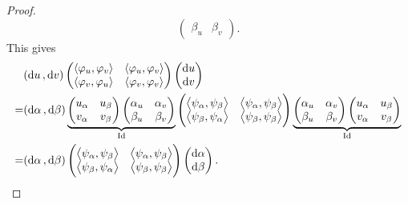 \begin{proof}
\[\begin{pmatrix}
            \beta_u & \beta_v
        \end{pmatrix}
    .\] This gives
    \begin{align*}
        &(\dd{u},\dd{v})
        \begin{pmatrix}
            \left<\varphi_u,\varphi_v\right> & \left<\varphi_u,\varphi_v\right> \\
            \left<\varphi_v,\varphi_u\right> & \left<\varphi_v,\varphi_v\right> 
        \end{pmatrix}\begin{pmatrix}
        \dd{u} \\ \dd{v}
        \end{pmatrix} \\
        =&(\dd{\alpha},\dd{\beta})\underbrace{\begin{pmatrix}
            u_\alpha & u_\beta \\
            v_\alpha & v_\beta
            \end{pmatrix}\begin{pmatrix}
            \alpha_u & \alpha_v \\
            \beta_u & \beta_v
        \end{pmatrix}}_{\mathrm{Id}}\begin{pmatrix}
        \left<\psi_\alpha,\psi_\beta\right> & \left<\psi_\alpha,\psi_\beta\right> \\
        \left<\psi_\beta,\psi_\alpha\right> & \left<\psi_\beta,\psi_\beta\right> 
        \end{pmatrix}\underbrace{\begin{pmatrix}
            \alpha_u & \alpha_v \\
            \beta_u & \beta_v
        \end{pmatrix}\begin{pmatrix}
            u_\alpha & u_\beta \\
            v_\alpha & v_\beta
        \end{pmatrix}}_{\mathrm{Id}} \\
        =& (\dd{\alpha},\dd{\beta})\begin{pmatrix}
        \left<\psi_\alpha,\psi_\beta\right> & \left<\psi_\alpha,\psi_\beta\right> \\
        \left<\psi_\beta,\psi_\alpha\right> & \left<\psi_\beta,\psi_\beta\right> 
        \end{pmatrix}\begin{pmatrix}
            \dd{\alpha} \\ \dd{\beta}
        \end{pmatrix}
    .\end{align*}
\end{proof}


